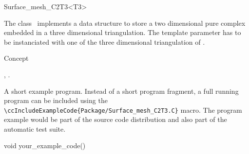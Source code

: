 

\begin{ccRefClass}{Surface_mesh_C2T3<T3>}  %


\ccDefinition
  
The class \ccRefName\  implements a data structure to store
a two dimensional pure  complex 
embedded in a three dimensional triangulation.
The template parameter  has to be instanciated
with one of the three dimensional triangulation of \cgal.




\ccIsModel

Concept 

\ccTypes


\ccCreation
{}  %


\ccOperations


\ccSeeAlso

,
.

\ccExample

A short example program.
Instead of a short program fragment, a full running program can be
included using the 
\verb|\ccIncludeExampleCode{Package/Surface_mesh_C2T3.C}| 
macro. The program example would be part of the source code distribution and
also part of the automatic test suite.

\begin{ccExampleCode}
void your_example_code() {
}
\end{ccExampleCode}


\end{ccRefClass}


